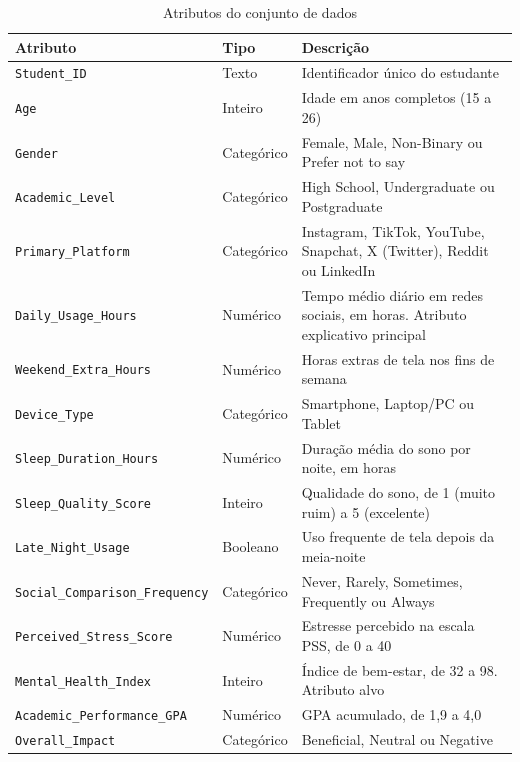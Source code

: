\documentclass[
  article,
  12pt,
  oneside,
  a4paper,
  english,
  brazil,
  chapter=TITLE,
  section=TITLE,
  subsection=TITLE
]{abntex2}
\begin{document}
\begin{table}[htb]
  \centering
  \caption{Atributos do conjunto de dados}
  \label{tab:atributos}
  \small
  \begin{tabular}{llp{7.2cm}}
    \toprule
    Atributo & Tipo & Descrição \\
    \midrule
    \texttt{Student\_ID} & Texto & Identificador único do estudante \\
    \texttt{Age} & Inteiro & Idade em anos completos (15 a 26) \\
    \texttt{Gender} & Categórico & Female, Male, Non-Binary ou Prefer not to say \\
    \texttt{Academic\_Level} & Categórico & High School, Undergraduate ou Postgraduate \\
    \texttt{Primary\_Platform} & Categórico & Instagram, TikTok, YouTube, Snapchat, X (Twitter), Reddit ou LinkedIn \\
    \texttt{Daily\_Usage\_Hours} & Numérico & Tempo médio diário em redes sociais, em horas. Atributo explicativo principal \\
    \texttt{Weekend\_Extra\_Hours} & Numérico & Horas extras de tela nos fins de semana \\
    \texttt{Device\_Type} & Categórico & Smartphone, Laptop/PC ou Tablet \\
    \texttt{Sleep\_Duration\_Hours} & Numérico & Duração média do sono por noite, em horas \\
    \texttt{Sleep\_Quality\_Score} & Inteiro & Qualidade do sono, de 1 (muito ruim) a 5 (excelente) \\
    \texttt{Late\_Night\_Usage} & Booleano & Uso frequente de tela depois da meia-noite \\
    \texttt{Social\_Comparison\_Frequency} & Categórico & Never, Rarely, Sometimes, Frequently ou Always \\
    \texttt{Perceived\_Stress\_Score} & Numérico & Estresse percebido na escala PSS, de 0 a 40 \\
    \texttt{Mental\_Health\_Index} & Inteiro & Índice de bem-estar, de 32 a 98. Atributo alvo \\
    \texttt{Academic\_Performance\_GPA} & Numérico & GPA acumulado, de 1,9 a 4,0 \\
    \texttt{Overall\_Impact} & Categórico & Beneficial, Neutral ou Negative \\
    \bottomrule
  \end{tabular}
\end{table}
\end{document}

